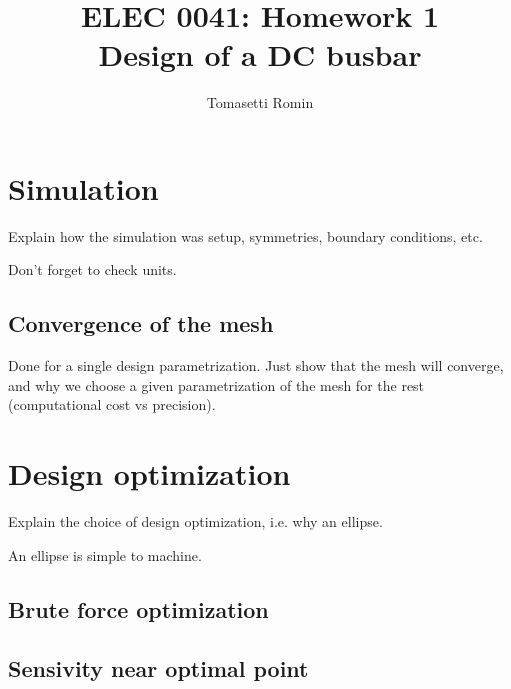 \documentclass[]{article}
\title{%
    ELEC 0041: Homework 1\\
    \large Design of a DC busbar
}
\author{Tomasetti Romin}
\begin{document}
\maketitle

\section{Simulation}

Explain how the simulation was setup, symmetries, boundary conditions, etc.

Don't forget to check units.

\subsection{Convergence of the mesh}

Done for a single design parametrization.
Just show that the mesh will converge, and why we choose a given parametrization of the mesh for the rest
(computational cost vs precision).

\section{Design optimization}

Explain the choice of design optimization, i.e. why an ellipse.

An ellipse is simple to machine.

\subsection{Brute force optimization}

\subsection{Sensivity near optimal point}
\end{document}
